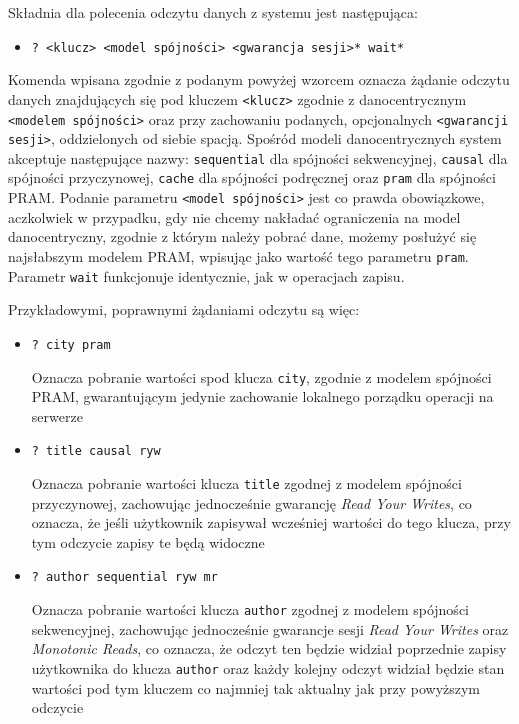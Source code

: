 Składnia dla polecenia odczytu danych z systemu jest następująca:

\begin{itemize}[label={}]
    \item \texttt{? <klucz> <model spójności> <gwarancja sesji>* wait*}
\end{itemize}

Komenda wpisana zgodnie z podanym powyżej wzorcem oznacza żądanie odczytu danych znajdujących się pod kluczem \texttt{<klucz>} zgodnie z danocentrycznym \texttt{<modelem~spójności>} oraz przy zachowaniu podanych, opcjonalnych \texttt{<gwarancji sesji>}, oddzielonych od siebie spacją. Spośród modeli danocentrycznych system akceptuje następujące nazwy: \texttt{sequential} dla spójności sekwencyjnej, \texttt{causal} dla spójności przyczynowej, \texttt{cache} dla spójności podręcznej oraz \texttt{pram} dla spójności PRAM. Podanie parametru \texttt{<model spójności>} jest co prawda obowiązkowe, aczkolwiek w przypadku, gdy nie chcemy nakładać ograniczenia na model danocentryczny, zgodnie z którym należy pobrać dane, możemy posłużyć się najsłabszym modelem PRAM, wpisując jako wartość tego parametru \texttt{pram}. Parametr \texttt{wait} funkcjonuje identycznie, jak w operacjach zapisu.

Przykładowymi, poprawnymi żądaniami odczytu są więc:

\begin{itemize}[label={}]
    \item \texttt{? city pram}
    
    Oznacza pobranie wartości spod klucza \texttt{city}, zgodnie z modelem spójności PRAM, gwarantującym jedynie zachowanie lokalnego porządku operacji na serwerze
    
    \item \texttt{? title causal ryw}
    
    Oznacza pobranie wartości klucza \texttt{title} zgodnej z modelem spójności przyczynowej, zachowując jednocześnie gwarancję \textit{Read Your Writes}, co oznacza, że jeśli użytkownik zapisywał wcześniej wartości do tego klucza, przy tym odczycie zapisy te będą widoczne
    
    \item \texttt{? author sequential ryw mr}
    
    Oznacza pobranie wartości klucza \texttt{author} zgodnej z modelem spójności sekwencyjnej, zachowując jednocześnie gwarancje sesji \textit{Read Your Writes} oraz \textit{Monotonic Reads}, co oznacza, że odczyt ten będzie widział poprzednie zapisy użytkownika do klucza \texttt{author} oraz każdy kolejny odczyt widział będzie stan wartości pod tym kluczem co najmniej tak aktualny jak przy powyższym odczycie
\end{itemize}

